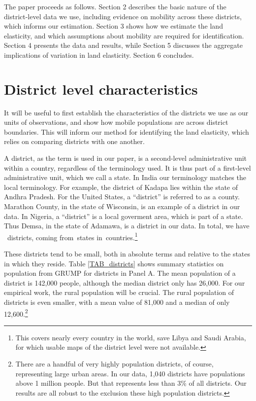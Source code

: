 \documentclass[11pt]{article}
\begin{document}
The paper proceeds as follows. Section 2 describes the basic nature of the district-level data we use, including evidence on mobility across these districts, which informs our estimation. Section 3 shows how we estimate the land elasticity, and which assumptions about mobility are required for identification. Section 4 presents the data and results, while Section 5 discusses the aggregate implications of variation in land elasticity. Section 6 concludes.

\section{District level characteristics}
It will be useful to first establish the characteristics of the districts we use as our units of observations, and show how mobile populations are across district boundaries. This will inform our method for identifying the land elasticity, which relies on comparing districts with one another.

A district, as the term is used in our paper, is a second-level administrative unit within a country, regardless of the terminology used. It is thus part of a first-level administrative unit, which we call a state. In India our terminology matches the local terminology. For example, the district of Kadapa lies within the state of Andhra Pradesh. For the United States, a ``district'' is referred to as a county. Marathon County, in the state of Wisconsin, is an example of a district in our data. In Nigeria, a ``district'' is a local goverment area, which is part of a state. Thus Demsa, in the state of Adamawa, is a district in our data. In total, we have \districts \ districts, coming from\provinces \ states in\countries \ countries.\footnote{This covers nearly every country in the world, save Libya and Saudi Arabia, for which usable maps of the district level were not available.}

These districts tend to be small, both in absolute terms and relative to the states in which they reside. Table \ref{TAB_districts} shows summary statistics on population from GRUMP \citep{grump2011} for districts in Panel A. The mean population of a district is 142,000 people, although the median district only has 26,000. For our empirical work, the rural population will be crucial. The rural population of districts is even smaller, with a mean value of 81,000 and a median of only 12,600.\footnote{There are a handful of very highly population districts, of course, representing large urban areas. In our data, 1,040 districts have populations above 1 million people. But that represents less than 3\% of all districts. Our results are all robust to the exclusion these high population districts.}
\end{document}
